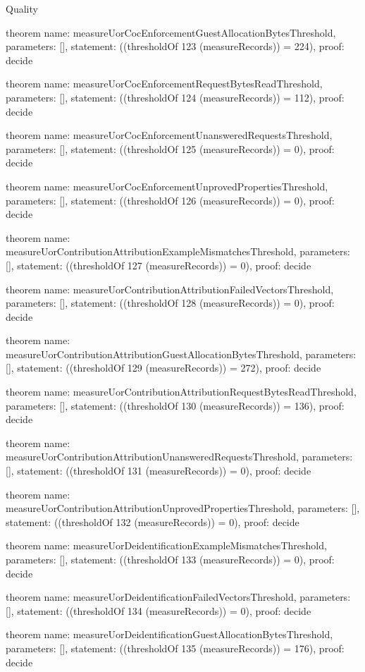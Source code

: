 \begin{lexlean}{Quality}
\begin{semanticmodule}
theorem{
  name: measureUorCocEnforcementGuestAllocationBytesThreshold,
  parameters: [],
  statement: ((thresholdOf 123 (measureRecords)) = 224),
  proof: decide{}
}

theorem{
  name: measureUorCocEnforcementRequestBytesReadThreshold,
  parameters: [],
  statement: ((thresholdOf 124 (measureRecords)) = 112),
  proof: decide{}
}

theorem{
  name: measureUorCocEnforcementUnansweredRequestsThreshold,
  parameters: [],
  statement: ((thresholdOf 125 (measureRecords)) = 0),
  proof: decide{}
}

theorem{
  name: measureUorCocEnforcementUnprovedPropertiesThreshold,
  parameters: [],
  statement: ((thresholdOf 126 (measureRecords)) = 0),
  proof: decide{}
}

theorem{
  name: measureUorContributionAttributionExampleMismatchesThreshold,
  parameters: [],
  statement: ((thresholdOf 127 (measureRecords)) = 0),
  proof: decide{}
}

theorem{
  name: measureUorContributionAttributionFailedVectorsThreshold,
  parameters: [],
  statement: ((thresholdOf 128 (measureRecords)) = 0),
  proof: decide{}
}

theorem{
  name: measureUorContributionAttributionGuestAllocationBytesThreshold,
  parameters: [],
  statement: ((thresholdOf 129 (measureRecords)) = 272),
  proof: decide{}
}

theorem{
  name: measureUorContributionAttributionRequestBytesReadThreshold,
  parameters: [],
  statement: ((thresholdOf 130 (measureRecords)) = 136),
  proof: decide{}
}

theorem{
  name: measureUorContributionAttributionUnansweredRequestsThreshold,
  parameters: [],
  statement: ((thresholdOf 131 (measureRecords)) = 0),
  proof: decide{}
}

theorem{
  name: measureUorContributionAttributionUnprovedPropertiesThreshold,
  parameters: [],
  statement: ((thresholdOf 132 (measureRecords)) = 0),
  proof: decide{}
}

theorem{
  name: measureUorDeidentificationExampleMismatchesThreshold,
  parameters: [],
  statement: ((thresholdOf 133 (measureRecords)) = 0),
  proof: decide{}
}

theorem{
  name: measureUorDeidentificationFailedVectorsThreshold,
  parameters: [],
  statement: ((thresholdOf 134 (measureRecords)) = 0),
  proof: decide{}
}

theorem{
  name: measureUorDeidentificationGuestAllocationBytesThreshold,
  parameters: [],
  statement: ((thresholdOf 135 (measureRecords)) = 176),
  proof: decide{}
}


\end{semanticmodule}
\end{lexlean}
